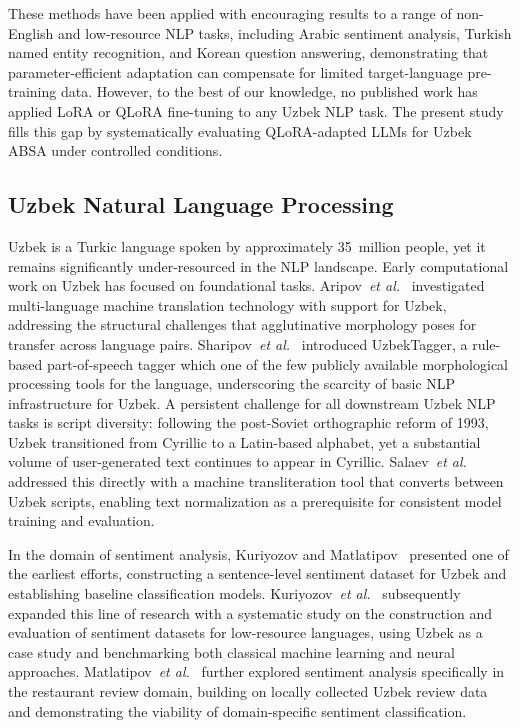 \documentclass[runningheads]{llncs}
\newcommand{\etal}{\textit{et al.}}
\begin{document}
These methods have been applied with encouraging results to a range of non-English and low-resource NLP tasks, including Arabic sentiment analysis, Turkish named entity recognition, and Korean question answering, demonstrating that parameter-efficient adaptation can compensate for limited target-language pre-training data. However, to the best of our knowledge, no published work has applied LoRA or QLoRA fine-tuning to any Uzbek NLP task. The present study fills this gap by systematically evaluating QLoRA-adapted LLMs for Uzbek ABSA under controlled conditions.

\subsection{Uzbek Natural Language Processing}
\label{sec:rw_uzbek}

Uzbek is a Turkic language spoken by approximately 35~million people, yet it remains significantly under-resourced in the NLP landscape. Early computational work on Uzbek has focused on foundational tasks. Aripov~\etal~\cite{10.1007/978-3-031-05328-3_6} investigated multi-language machine translation technology with support for Uzbek, addressing the structural challenges that agglutinative morphology poses for transfer across language pairs. Sharipov~\etal~\cite{sharipov-et-all,sharipov2023uzbektagger} introduced UzbekTagger, a rule-based part-of-speech tagger which one of the few publicly available morphological processing tools for the language, underscoring the scarcity of basic NLP infrastructure for Uzbek. A persistent challenge for all downstream Uzbek NLP tasks is script diversity: following the post-Soviet orthographic reform of 1993, Uzbek transitioned from Cyrillic to a Latin-based alphabet, yet a substantial volume of user-generated text continues to appear in Cyrillic. Salaev~\etal~\cite{Salaev2024} addressed this directly with a machine transliteration tool that converts between Uzbek scripts, enabling text normalization as a prerequisite for consistent model training and evaluation.

In the domain of sentiment analysis, Kuriyozov and Matlatipov~\cite{kuriyozov2019building} presented one of the earliest efforts, constructing a sentence-level sentiment dataset for Uzbek and establishing baseline classification models. Kuriyozov~\etal~\cite{kuriyozov2022construction} subsequently expanded this line of research with a systematic study on the construction and evaluation of sentiment datasets for low-resource languages, using Uzbek as a case study and benchmarking both classical machine learning and neural approaches. Matlatipov~\etal~\cite{Matlatipov2009} further explored sentiment analysis specifically in the restaurant review domain, building on locally collected Uzbek review data and demonstrating the viability of domain-specific sentiment classification.
\end{document}
